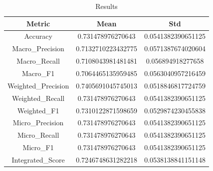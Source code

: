 \begin{table}[htbp]
\centering
\caption{Results}
\label{tab:csv}
\small
\setlength{\tabcolsep}{4pt}
\begin{tabular}{|c|c|c|}
\hline
Metric & Mean & Std \\
\hline
Accuracy & 0.731478976270643 & 0.0541382390651125 \\
Macro_Precision & 0.7132710223432775 & 0.0571387674020604 \\
Macro_Recall & 0.7108043981481481 & 0.056894918277658 \\
Macro_F1 & 0.7064465135959485 & 0.0563040957216459 \\
Weighted_Precision & 0.7405691045745013 & 0.0518846817724759 \\
Weighted_Recall & 0.731478976270643 & 0.0541382390651125 \\
Weighted_F1 & 0.7310122871598659 & 0.0529874230455838 \\
Micro_Precision & 0.731478976270643 & 0.0541382390651125 \\
Micro_Recall & 0.731478976270643 & 0.0541382390651125 \\
Micro_F1 & 0.731478976270643 & 0.0541382390651125 \\
Integrated_Score & 0.7246748631282218 & 0.0538138841151148 \\
\hline
\end{tabular}
\end{table}